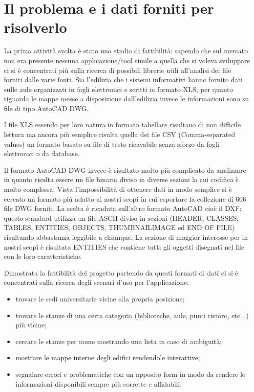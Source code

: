 \documentclass[12pt]{report}
\begin{document}
\newpage
\section{Il problema e i dati forniti per risolverlo}

La prima attività svolta è stato uno studio di fattibilità: sapendo che sul mercato non era presente nessuna applicazione/tool simile a quella che si voleva sviluppare ci si è concentrati più sulla ricerca di possibili librerie utili all'analisi dei file forniti dalle varie fonti. 
Sia l'edilizia che i sistemi informativi hanno fornito dati sulle aule organizzati in fogli elettronici e scritti in formato XLS, per quanto riguarda le mappe messe a disposizione dall'edilizia invece le informazioni sono su file di tipo AutoCAD DWG. 

\vspace{5mm} %

I file XLS essendo per loro natura in formato tabellare risultano di non difficile lettura ma ancora più semplice risulta quella dei file CSV (Comma-separated values) un formato basato su file di testo ricavabile senza sforzo da fogli elettronici o da database. 

Il formato AutoCAD DWG invece è risultato molto più complicato da analizzare in quanto risulta essere un file binario diviso in diverse sezioni la cui codifica è molto complessa. Vista l'impossibilità di ottenere dati in modo semplice si è cercato un formato più adatto ai nostri scopi in cui esportare la collezione di 606 file DWG forniti. La scelta è ricaduta sull'altro formato AutoCAD cioè il DXF: questo standard utilizza un file ASCII diviso in sezioni (HEADER, CLASSES, TABLES, ENTITIES, OBJECTS, THUMBNAILIMAGE ed END OF FILE) risultando abbastanza leggibile a chiunque. La sezione di maggior interesse per in nostri scopi è risultata ENTITIES che contiene tutti gli oggetti disegnati nel file con le loro caratteristiche.

\vspace{5mm} %

Dimostrata la fattibilità del progetto partendo da questi formati di dati ci si è concentrati sulla ricerca degli scenari d'uso per l'applicazione:        
\begin{itemize}
\item trovare le sedi universitarie vicine alla propria posizione;
\item trovare le stanze di una certa categoria (biblioteche, aule, punti ristoro, etc...) più vicine;
\item cercare le stanze per nome mostrando una lista in caso di ambiguità;
\item mostrare le mappe interne degli edifici rendendole interattive;
\item segnalare errori e problematiche con un apposito form in modo da rendere le informazioni disponibili sempre più corrette e affidabili.
\end{itemize}
\end{document}
